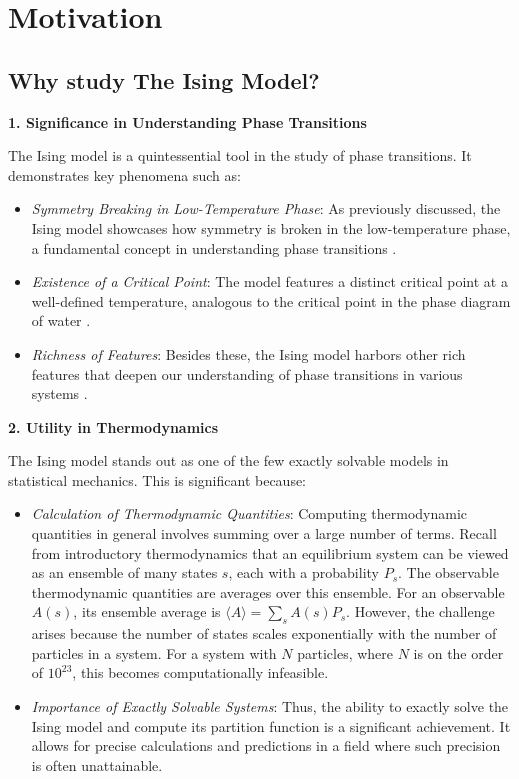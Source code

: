 \section{Motivation}
\label{sec:motivation}
\subsection{Why study The Ising Model?}
\textbf{1. Significance in Understanding Phase Transitions}

The Ising model is a quintessential tool in the study of phase transitions. It
demonstrates key phenomena such as:

\begin{itemize}
  \item \textit{Symmetry Breaking in Low-Temperature Phase}: As previously
  discussed, the Ising model showcases how symmetry is broken in the
  low-temperature phase, a fundamental concept in understanding phase
  transitions \cite{stanley1971phase,Binney2002}.
  \item \textit{Existence of a Critical Point}: The model features a distinct
  critical point at a well-defined temperature, analogous to the critical point
  in the phase diagram of water \cite{Feuerbacher1986}.
  \item \textit{Richness of Features}: Besides these, the Ising model harbors
  other rich features that deepen our understanding of phase transitions in
  various systems \cite{Behn1988}.
\end{itemize}

\textbf{2. Utility in Thermodynamics}

The Ising model stands out as one of the few exactly solvable models in
statistical mechanics. This is significant because:

\begin{itemize}
  \item \textit{Calculation of Thermodynamic Quantities}: Computing
  thermodynamic quantities in general involves summing over a large number of
  terms. Recall from introductory thermodynamics
  \cite{Tuckerman2023,Kardar2013,Yoshioka2007} that an equilibrium system can be
  viewed as an ensemble of many states \( s \), each with a probability \( P_s
  \). The observable thermodynamic quantities are averages over this ensemble.
  For an observable \( A(s) \), its ensemble average is \( \langle A \rangle =
  \sum_s A(s) P_s \). However, the challenge arises because the number of states
  scales exponentially with the number of particles in a system. For a system
  with \( N \) particles, where \( N \) is on the order of \( 10^{23} \), this
  becomes computationally infeasible.
  \item \textit{Importance of Exactly Solvable Systems}: Thus, the ability to
  exactly solve the Ising model \cite{Ising1925,Onsager1944} and compute its
  partition function is a significant achievement. It allows for precise
  calculations and predictions in a field where such precision is often
  unattainable.
\end{itemize}

